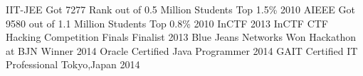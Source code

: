 \begin{cvhonors}
  \cvhonor
    {IIT-JEE}
    {Got 7277 Rank out of 0.5 Million Students}
    {Top 1.5\%}
    {2010}
  \cvhonor
    {AIEEE}
    {Got 9580 out of 1.1 Million Students}
    {Top 0.8\%}
    {2010}
  \cvhonor
    {InCTF 2013}
    {InCTF CTF Hacking Competition Finals}
    {Finalist}
    {2013}
  \cvhonor
    {Blue Jeans Networks}
    {Won Hackathon at BJN}
    {Winner}
    {2014}
   \cvhonor
    {Oracle Certified }
    {Java Programmer}
    {}
    {2014}
    \cvhonor
    {GAIT Certified }
    {IT Professional}
    {Tokyo,Japan}
    {2014}
\end{cvhonors}

